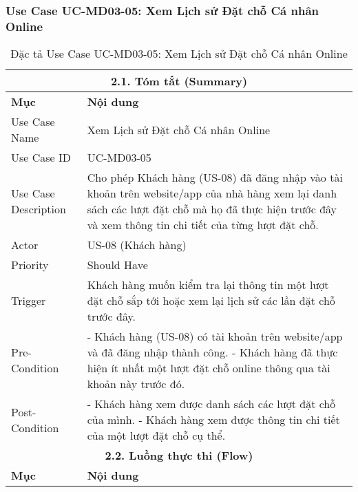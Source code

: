 \subsubsection{Use Case UC-MD03-05: Xem Lịch sử Đặt chỗ Cá nhân Online}
\begin{longtable}{|m{4cm}|p{11cm}|}
\caption{Đặc tả Use Case UC-MD03-05: Xem Lịch sử Đặt chỗ Cá nhân Online} \label{tab:uc_md03_05_revised_v3} \\
\hline
\multicolumn{2}{|c|}{\textbf{2.1. Tóm tắt (Summary)}} \\
\hline
\textbf{Mục} & \textbf{Nội dung} \\
\hline
\endhead %
\hline
\endfoot %
\hline
\endlastfoot %
Use Case Name & Xem Lịch sử Đặt chỗ Cá nhân Online \\
\hline
Use Case ID & UC-MD03-05 \\
\hline
Use Case Description & Cho phép Khách hàng (US-08) đã đăng nhập vào tài khoản trên website/app của nhà hàng xem lại danh sách các lượt đặt chỗ mà họ đã thực hiện trước đây và xem thông tin chi tiết của từng lượt đặt chỗ. \\
\hline
Actor & US-08 (Khách hàng) \\
\hline
Priority & Should Have \\
\hline
Trigger & Khách hàng muốn kiểm tra lại thông tin một lượt đặt chỗ sắp tới hoặc xem lại lịch sử các lần đặt chỗ trước đây. \\
\hline
Pre-Condition & - Khách hàng (US-08) có tài khoản trên website/app và đã đăng nhập thành công. \newline - Khách hàng đã thực hiện ít nhất một lượt đặt chỗ online thông qua tài khoản này trước đó. \\
\hline
Post-Condition & - Khách hàng xem được danh sách các lượt đặt chỗ của mình. \newline - Khách hàng xem được thông tin chi tiết của một lượt đặt chỗ cụ thể. \\
\hline
\multicolumn{2}{|c|}{\textbf{2.2. Luồng thực thi (Flow)}} \\
\hline
\textbf{Mục} & \textbf{Nội dung} \\
\hline

\end{longtable}
